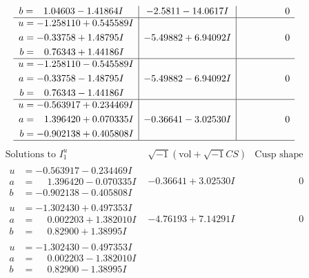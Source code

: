 \documentclass[1p]{elsarticle_modified}
\theoremstyle{definition}
\newcommand{\I}{\sqrt{-1}}
\begin{document}
$$\begin{array}{c|c|c}
\begin{aligned}
b &= \phantom{-}1.04603 - 1.41864 I\end{aligned}
 & -2.5811 - 14.0617 I & \phantom{-0.000000 } 0 \\ \hline\begin{aligned}
u &= -1.258110 + 0.545589 I \\
a &= -0.33758 + 1.48795 I \\
b &= \phantom{-}0.76343 + 1.44186 I\end{aligned}
 & -5.49882 + 6.94092 I & \phantom{-0.000000 } 0 \\ \hline\begin{aligned}
u &= -1.258110 - 0.545589 I \\
a &= -0.33758 - 1.48795 I \\
b &= \phantom{-}0.76343 - 1.44186 I\end{aligned}
 & -5.49882 - 6.94092 I & \phantom{-0.000000 } 0 \\ \hline\begin{aligned}
u &= -0.563917 + 0.234469 I \\
a &= \phantom{-}1.396420 + 0.070335 I \\
b &= -0.902138 + 0.405808 I\end{aligned}
 & -0.36641 - 3.02530 I & \phantom{-0.000000 } 0\\
 \hline 
 \end{array}$$\newpage$$\begin{array}{c|c|c}  
\text{Solutions to }I^u_{1}& \I (\text{vol} + \sqrt{-1}CS) & \text{Cusp shape}\\
 \hline 
\begin{aligned}
u &= -0.563917 - 0.234469 I \\
a &= \phantom{-}1.396420 - 0.070335 I \\
b &= -0.902138 - 0.405808 I\end{aligned}
 & -0.36641 + 3.02530 I & \phantom{-0.000000 } 0 \\ \hline\begin{aligned}
u &= -1.302430 + 0.497353 I \\
a &= \phantom{-}0.002203 + 1.382010 I \\
b &= \phantom{-}0.82900 + 1.38995 I\end{aligned}
 & -4.76193 + 7.14291 I & \phantom{-0.000000 } 0 \\ \hline\begin{aligned}
u &= -1.302430 - 0.497353 I \\
a &= \phantom{-}0.002203 - 1.382010 I \\
b &= \phantom{-}0.82900 - 1.38995 I\end{aligned}

\end{array}$$
\end{document}
